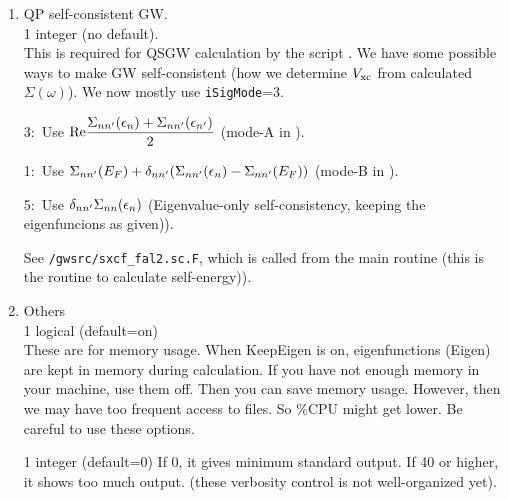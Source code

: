{\begin{enumerate}
\item QP self-consistent GW.\\
 1 integer (no default).\\
This is required for QSGW calculation by the script .
We have some possible ways to make GW self-consistent
(how we determine $V_{\rm xc}$ from calculated $\Sigma(\omega)$).
We now mostly use {\tt iSigMode}=3. 

3:\ Use $\displaystyle {\rm Re}\frac{\Sigma_{nn'}(\epsilon_n)+\Sigma_{nn'}(\epsilon_{n'})}{2}$
  (mode-A in \cite{xxx}).

1:\ Use $\displaystyle \Sigma_{nn'}(E_F) + \delta_{nn'}(\Sigma_{nn'}(\epsilon_n)-\Sigma_{nn'}(E_F))$
   (mode-B in \cite{xxx}).

5:\ Use $\displaystyle \delta_{nn'} \Sigma_{nn}(\epsilon_n)$ (Eigenvalue-only
      self-consistency, keeping the eigenfuncions as given)).

See \verb#/gwsrc/sxcf_fal2.sc.F#, which is called from the main routine
       (this is the routine to calculate self-energy)).



\item Others\\
 1 logical (default=on) \\
These are for memory usage.
When KeepEigen is on, eigenfunctions (Eigen) are kept in memory during calculation.
If you have not enough memory in your machine, use them off. 
Then you can save memory usage. However, then we may have too frequent access to files.
So \%CPU might get lower. Be careful to use these options.


 1 integer (default=0)
If 0, it gives minimum standard output.
If 40 or higher, it shows too much output.
(these verbosity control is not well-organized yet). 



\end{enumerate}}
